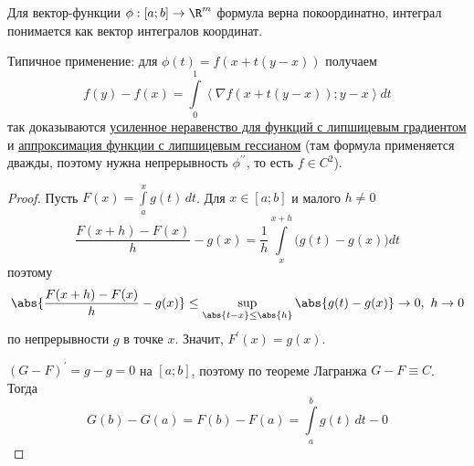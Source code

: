 

\begin{remark}
  Для вектор-функции $\phi: [a;b] \rightarrow \R^m$ формула верна покоординатно, интеграл понимается как вектор интегралов координат.
\end{remark}

\begin{remark}
  Типичное применение: для $\phi(t) = f(x + t(y - x))$ получаем
  \[
  f(y) - f(x) = \int\limits_0^1 \left\langle \nabla f(x + t(y-x)); y - x \right\rangle dt
  \]
  так доказываются \hyperref[note:379E4CAD-A44B-4631-8DAF-F3DC708EAEDE]{усиленное неравенство для функций с липшицевым градиентом} и \hyperref[note:81C8B68E-DAAD-4B86-BAEB-AB0E1C07442F]{аппроксимация функции с липшицевым гессианом} (там формула применяется дважды, поэтому нужна непрерывность $\phi^{\prime\prime}$, то есть $f \in C^2$).
\end{remark}

\begin{proof}
  Пусть $F(x) = \int\limits_a^x g(t)\, dt$. Для $x \in [a;b]$ и малого $h \ne 0$
  \[
  \frac{F(x + h) - F(x)}{h} - g(x) = \frac{1}{h} \int\limits_x^{x+h} \big( g(t) - g(x) \big) dt
  \]
  поэтому
  \[
  \abs{\frac{F(x + h) - F(x)}{h} - g(x)} \le \sup\limits_{\abs{t - x} \le \abs{h}} \abs{g(t) - g(x)} \rightarrow 0,\ h \rightarrow 0
  \]
  по непрерывности $g$ в точке $x$. Значит, $F^{\prime}(x) = g(x)$.

  $(G - F)^{\prime} = g - g = 0$ на $[a;b]$, поэтому по теореме Лагранжа $G - F \equiv C$. Тогда
  \[
  G(b) - G(a) = F(b) - F(a) = \int\limits_a^b g(t)\, dt - 0
  \]
\end{proof}
